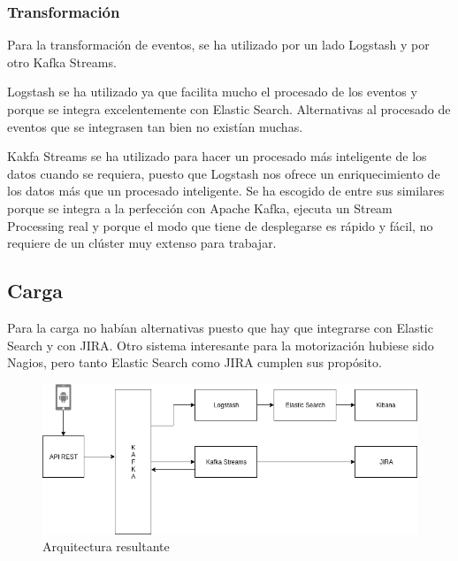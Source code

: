 \subsubsection{Transformación}

Para la transformación de eventos, se ha utilizado por un lado Logstash y por otro Kafka Streams.

Logstash se ha utilizado ya que facilita mucho el procesado de los eventos y porque se integra excelentemente con Elastic Search. Alternativas al procesado de eventos que se integrasen tan bien no existían muchas.

Kakfa Streams se ha utilizado para hacer un procesado más inteligente de los datos cuando se requiera, puesto que Logstash nos ofrece un enriquecimiento de los datos más que un procesado inteligente. Se ha escogido de entre sus similares porque se integra a la perfección con Apache Kafka, ejecuta un Stream Processing real y porque el modo que tiene de desplegarse es rápido y fácil, no requiere de un clúster muy extenso para trabajar.

\subsection{Carga} 
Para la carga no habían alternativas puesto que hay que integrarse con Elastic Search y con JIRA. Otro sistema interesante para la motorización hubiese sido Nagios, pero tanto Elastic Search como JIRA cumplen sus propósito.

\begin{figure}
	\includegraphics[width=\linewidth]{Arquitectura.png}
	\caption{Arquitectura resultante}
	\label{fig:arquitectura}
\end{figure}